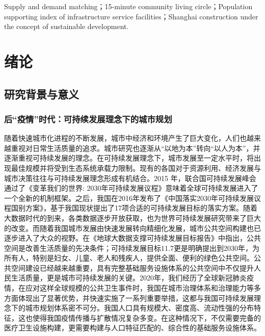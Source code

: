 \documentclass{shnuthesis}
\begin{document}
\begin{enabstract}{Supply and demand matching；15-minute community living circle；Population supporting index of infrastructure service facilities；Shanghai}
construction under the concept of sustainable development.


\end{enabstract}
	
    \maketoc[pagenumtoc]
	\cleardoublepage  %
	
    \mainmatter



\chapter{绪论}

\section{研究背景与意义}

\subsection{后“疫情”时代：可持续发展理念下的城市规划}

随着快速城市化进程的不断发展，城市中经济和环境产生了巨大变化，人们也越来越重视对日常生活质量的追求。城市研究也逐渐从“以地为本”转向“以人为本”，并逐渐重视可持续发展的理念。在可持续发展理念下，城市发展至一定水平时，将出现最佳规模并将受到生态系统承载力限制\textsuperscript{\cite{zhu2018}}。现有的各国对于资源利用、经济发展与城市决策往往与可持续发展理念形成有机结合。2015 年，联合国可持续发展峰会通过了《变革我们的世界: 2030年可持续发展议程》意味着全球可持续发展进入了一个全新的机制框架\textsuperscript{\cite{lee2016}}。之后，我国在2016年发布了《中国落实2030年可持续发展议程国别方案》，基于我国现状提出了17项合适的可持续发展目标的落实方案\textsuperscript{\cite{li2017a}}。随着大数据时代的到来，各类数据逐步开放获取，也为世界可持续发展研究带来了巨大的改变。而随着我国城市发展由快速发展转向精细化发展，城市公共空间构建也已逐步进入了大众的视野。在《地球大数据支撑可持续发展目标报告》中指出，公共空间是改善生活质量的先决条件；可持续发展目标11.7更是明确提出到2030年，为所有人，特别是妇女、儿童、老人和残疾人，提供全面、便利的绿色公共空间\textsuperscript{\cite{wang2018}}。公共空间建设已经越来越重要，具有完整基础服务设施体系的公共空间中不仅提升人民生活质量，更是城市可持续发展的关键。2020年，我们经历了全球新冠肺炎疫情，在应对这样全球规模的公共卫生事件时，我国在城市治理体系和治理能力等多方面体现出了显著优势，并快速实施了一系列重要举措，这都与我国可持续发展理念下的城市规划体系密不可分。我国人口具有规模大、密度高、流动性强的分布特征，这也使得我国疫情传播与扩散情况复杂多变。在这种情况下，不仅需要完备的医疗卫生设施构建，更需要构建与人口特征匹配的、综合性的基础服务设施体系。
\end{document}
